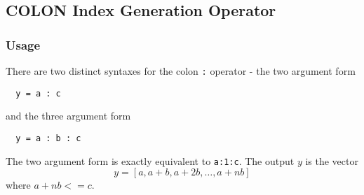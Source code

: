 %
%
%
\subsection{COLON Index Generation Operator}
\subsubsection{Usage}
There are two distinct syntaxes for the colon \verb|:| operator - the two argument form
\begin{verbatim}
  y = a : c
\end{verbatim}
and the three argument form
\begin{verbatim}
  y = a : b : c
\end{verbatim}
The two argument form is exactly equivalent to \verb|a:1:c|.  The output $y$ is the vector
\[
  y = [a,a+b,a+2b,\ldots,a+nb]
\]
where $a+nb <= c$.
